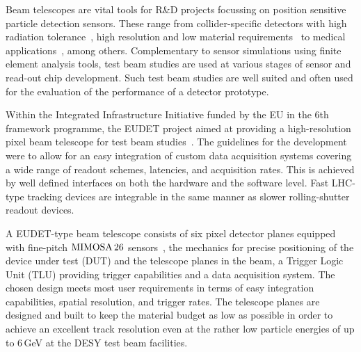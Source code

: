
Beam telescopes are vital tools for R\&D projects focussing on position sensitive particle detection sensors. 
These range from collider-specific detectors with high radiation tolerance~\cite{1748-0221-9-12-C12001,1748-0221-9-12-C12029},
 high resolution and low material requirements~\cite{1748-0221-10-03-C03044} to medical applications~\cite{Ballabriga2011S15}, among others. 
Complementary to sensor simulations using finite element analysis tools, test beam studies are used at various stages of sensor and read-out chip development. 
Such test beam studies are well suited and often used for the evaluation of the performance of a detector prototype. %

Within the Integrated Infrastructure Initiative funded by the EU in the 6th framework programme,
 the EUDET project aimed at providing a high-resolution pixel beam telescope for test beam studies~\cite{ref:eudetreport200902}.
The guidelines for the development were to allow for an easy integration of custom data acquisition systems covering a wide range of readout schemes, latencies, and acquisition rates.
This is achieved by well defined interfaces on both the hardware and the software level. 
Fast LHC-type tracking devices are integrable in the same manner as slower rolling-shutter readout devices. 

A EUDET-type beam telescope consists of six pixel detector planes equipped with fine-pitch $\textrm{MIMOSA\,26}$ sensors~\cite{HuGuo2010480},
 the mechanics for precise positioning of the device under test (DUT) and the telescope planes in the beam, a Trigger Logic Unit (TLU) providing trigger capabilities and a data acquisition system.
The chosen design meets most user requirements in terms of easy integration capabilities, spatial resolution, and trigger rates. 
The telescope planes are designed and built to keep the material budget as low as possible in order to achieve an excellent track resolution
 even at the rather low particle energies of up to 6\,GeV at the DESY test beam facilities.

